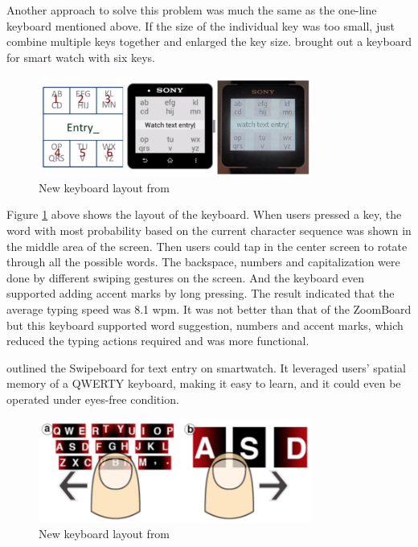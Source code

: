 \documentclass[11pt]{article}
\begin{document}
Another approach to solve this problem was much the same as the one-line keyboard \citep{10.1145/2047196.2047257} mentioned above. If the size of the individual key was too small, just combine multiple keys together and enlarged the key size. \citet{6926662} brought out a keyboard for smart watch with six keys.

\begin{figure}[H]
  \centering
  \includegraphics[width=0.8\textwidth]{Watch2014T9.png}
  \caption{New keyboard layout from \citep{6926662}}
  \label{fig:watch2014t9}
\end{figure}

Figure \ref{fig:watch2014t9} above shows the layout of the keyboard. When users pressed a key, the word with most probability based on the current character sequence was shown in the middle area of the screen. Then users could tap in the center screen to rotate through all the possible words. The backspace, numbers and capitalization were done by different swiping gestures on the screen. And the keyboard even supported adding accent marks by long pressing. The result indicated that the average typing speed was 8.1 wpm. It was not better than that of the ZoomBoard but this keyboard supported word suggestion, numbers and accent marks, which reduced the typing actions required and was more functional.

\citet{10.1145/2642918.2647354} outlined the Swipeboard for text entry on smartwatch. It leveraged users' spatial memory of a QWERTY keyboard, making it easy to learn, and it could even be operated under eyes-free condition.

\begin{figure}[H]
  \centering
  \includegraphics[width=0.8\textwidth]{SwipeBoard.png}
  \caption{New keyboard layout from \citep{10.1145/2642918.2647354}}
  \label{fig:swipeboard}
\end{figure}
\end{document}
